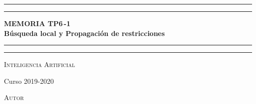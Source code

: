 \documentclass[a4paper, 10pt]{report}
\begin{document}
\begin{titlepage} %
	\centering %

	
	\vspace*{\baselineskip} %
	
	
	\rule{\textwidth}{1.6pt}\vspace*{-\baselineskip}\vspace*{2pt} %
	\rule{\textwidth}{0.4pt} %
	
	\vspace{0.75\baselineskip} %
	
	{\bfseries \color[rgb]{0.1608,0.2392,0.4214}\Huge MEMORIA TP6\,-1 \\ 
	\huge Búsqueda local y Propagación de restricciones\\} %
	
	\vspace{0.75\baselineskip} %
	
	\rule{\textwidth}{0.4pt}\vspace*{-\baselineskip}\vspace{3.2pt} %
	\rule{\textwidth}{1.6pt} %
	
	\vspace{2\baselineskip} %
	
	{\scshape \LARGE Inteligencia Artificial}
	
	\vspace*{0.5\baselineskip} %
	
	{\large Curso 2019-2020} %

	
	\vspace*{4\baselineskip} %
	
	
	{\scshape Autor}
	
	\vspace{0.5\baselineskip} %
	

\end{titlepage}
\end{document}
